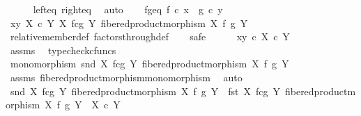 \begin{isabellebody}
\ \ \ \ \isamarkupfalse%
\ left{\isacharunderscore}{\kern0pt}eq\ right{\isacharunderscore}{\kern0pt}eq\ \isamarkupfalse%
\ auto\isanewline
{}\isamarkupfalse%
\isanewline
\ \ \isamarkupfalse%
\ f{\isacharunderscore}{\kern0pt}g{\isacharunderscore}{\kern0pt}eq{\isacharcolon}{\kern0pt}\ {\isachardoublequoteopen}f\ {\isasymcirc}\isactrlsub c\ x\ {\isacharequal}{\kern0pt}\ g\ {\isasymcirc}\isactrlsub c\ y{\isachardoublequoteclose}\isanewline
\ \ \isamarkupfalse%
\ {\isachardoublequoteopen}{\isasymlangle}x{\isacharcomma}{\kern0pt}y{\isasymrangle}\ {\isasymin}\isactrlbsub X\ {\isasymtimes}\isactrlsub c\ Y\isactrlesub \ {\isacharparenleft}{\kern0pt}X\ \isactrlbsub f\isactrlesub {\isasymtimes}\isactrlsub c\isactrlbsub g\isactrlesub \ Y{\isacharcomma}{\kern0pt}\ fibered{\isacharunderscore}{\kern0pt}product{\isacharunderscore}{\kern0pt}morphism\ X\ f\ g\ Y{\isacharparenright}{\kern0pt}{\isachardoublequoteclose}\isanewline
\ \ \ \ \isamarkupfalse%
\ relative{\isacharunderscore}{\kern0pt}member{\isacharunderscore}{\kern0pt}def\ factors{\isacharunderscore}{\kern0pt}through{\isacharunderscore}{\kern0pt}def\isanewline
\ \ \isamarkupfalse%
\ {\isacharparenleft}{\kern0pt}safe{\isacharparenright}{\kern0pt}\isanewline
\ \ \ \ \isamarkupfalse%
\ {\isachardoublequoteopen}{\isasymlangle}x{\isacharcomma}{\kern0pt}y{\isasymrangle}\ {\isasymin}\isactrlsub c\ X\ {\isasymtimes}\isactrlsub c\ Y{\isachardoublequoteclose}\isanewline
\ \ \ \ \ \ \isamarkupfalse%
\ assms\ \isamarkupfalse%
\ typecheck{\isacharunderscore}{\kern0pt}cfuncs\isanewline
\ \ \ \ \isamarkupfalse%
\ {\isachardoublequoteopen}monomorphism\ {\isacharparenleft}{\kern0pt}snd\ {\isacharparenleft}{\kern0pt}X\ \isactrlbsub f\isactrlesub {\isasymtimes}\isactrlsub c\isactrlbsub g\isactrlesub \ Y{\isacharcomma}{\kern0pt}\ fibered{\isacharunderscore}{\kern0pt}product{\isacharunderscore}{\kern0pt}morphism\ X\ f\ g\ Y{\isacharparenright}{\kern0pt}{\isacharparenright}{\kern0pt}{\isachardoublequoteclose}\isanewline
\ \ \ \ \ \ \isamarkupfalse%
\ assms{\isacharparenleft}{\kern0pt}{}{\isacharcomma}{\kern0pt}{}{\isacharparenright}{\kern0pt}\ fibered{\isacharunderscore}{\kern0pt}product{\isacharunderscore}{\kern0pt}morphism{\isacharunderscore}{\kern0pt}monomorphism\ \isamarkupfalse%
\ auto\isanewline
\ \ \ \ \isamarkupfalse%
\ {\isachardoublequoteopen}snd\ {\isacharparenleft}{\kern0pt}X\ \isactrlbsub f\isactrlesub {\isasymtimes}\isactrlsub c\isactrlbsub g\isactrlesub \ Y{\isacharcomma}{\kern0pt}\ fibered{\isacharunderscore}{\kern0pt}product{\isacharunderscore}{\kern0pt}morphism\ X\ f\ g\ Y{\isacharparenright}{\kern0pt}\ {\isacharcolon}{\kern0pt}\ fst\ {\isacharparenleft}{\kern0pt}X\ \isactrlbsub f\isactrlesub {\isasymtimes}\isactrlsub c\isactrlbsub g\isactrlesub \ Y{\isacharcomma}{\kern0pt}\ fibered{\isacharunderscore}{\kern0pt}product{\isacharunderscore}{\kern0pt}morphism\ X\ f\ g\ Y{\isacharparenright}{\kern0pt}\ {\isasymrightarrow}\ X\ {\isasymtimes}\isactrlsub c\ Y{\isachardoublequoteclose}\isanewline

\end{isabellebody}
